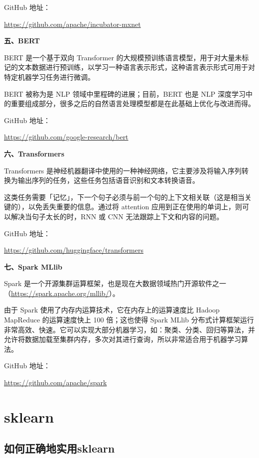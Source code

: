 \documentclass[]{ctexbook}
\begin{document}
GitHub 地址：

\url{https://github.com/apache/incubator-mxnet}

\textbf{五、BERT}

BERT 是一个基于双向 Transformer 的大规模预训练语言模型，用于对大量未标记的文本数据进行预训练，以学习一种语言表示形式，这种语言表示形式可用于对特定机器学习任务进行微调。

BERT 被称为是 NLP 领域中里程碑的进展；目前，BERT 也是 NLP 深度学习中的重要组成部分，很多之后的自然语言处理模型都是在此基础上优化与改进而得。

GitHub 地址：

\url{https://github.com/google-research/bert}

\textbf{六、Transformers}

Transformers 是神经机器翻译中使用的一种神经网络，它主要涉及将输入序列转换为输出序列的任务，这些任务包括语音识别和文本转换语音。

这类任务需要「记忆」，下一个句子必须与前一个句的上下文相关联（这是相当关键的），以免丢失重要的信息。通过将 attention 应用到正在使用的单词上，则可以解决当句子太长的时，RNN 或 CNN 无法跟踪上下文和内容的问题。

GitHub 地址：

\url{https://github.com/huggingface/transformers}

\textbf{七、Spark MLlib}

Spark 是一个开源集群运算框架，也是现在大数据领域热门开源软件之一（\url{https://spark.apache.org/mllib/}）。

由于 Spark 使用了内存内运算技术，它在内存上的运算速度比 Hadoop MapReduce 的运算速度快上 100 倍；这也使得 Spark MLlib 分布式计算框架运行非常高效、快速。它可以实现大部分机器学习，如：聚类、分类、回归等算法，并允许将数据加载至集群内存，多次对其进行查询，所以非常适合用于机器学习算法。

GitHub 地址：

\url{https://github.com/apache/spark}

\hypertarget{sklearn}{%
\section{sklearn}\label{sklearn}}

\hypertarget{ux5982ux4f55ux6b63ux786eux5730ux5b9eux7528sklearn}{%
\subsection{如何正确地实用sklearn}\label{ux5982ux4f55ux6b63ux786eux5730ux5b9eux7528sklearn}}
\end{document}
